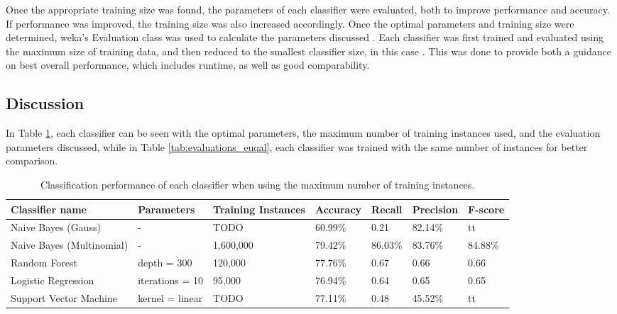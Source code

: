 Once the appropriate training size was found, the parameters of each classifier were evaluated, both to improve performance and accuracy. If performance was improved, the training size was also increased accordingly. Once the optimal parameters and training size were determined, weka's Evaluation class was used to calculate the parameters discussed \cite{weka}. Each classifier was first trained and evaluated using the maximum size of training data, and then reduced to the smallest classifier size, in this case . This was done to provide both a guidance on best overall performance, which includes runtime, as well as good comparability.

\subsection{Discussion}
In Table \ref{tab:evaluations_max}, each classifier can be seen with the optimal parameters, the maximum number of training instances used, and the evaluation parameters discussed, while in Table \ref{tab:evaluations_euqal}, each classifier was trained with the same number of instances for better comparison.
\begin{table}[]
\centering
\caption{Classification performance of each classifier when using the maximum number of training instances.}
\begin{tabular}{ |p{3cm}||p{3cm}|p{2cm}|p{1.5cm}|p{1.5cm}|p{1.5cm}|p{1.5cm}| }
 \hline
 Classifier name &          Parameters &             Training Instances &    Accuracy &      Recall &     Precision& F-score \\
 \hline
 Naive Bayes (Gauss)        &-&            TODO&                 60.99\%&        0.21&       82.14\%& tt\\
  \hline
 Naive Bayes (Multinomial)  &-&                     1,600,000&                79.42\%&        86.03\%&       83.76\%& 84.88\%\\
  \hline
 Random Forest              &depth = 300&            120,000&                 77.76\%&        0.67&       0.66& 0.66\\
  \hline
 Logistic Regression        &iterations = 10&            95,000&                 76.94\%&        0.64&       0.65& 0.65\\
  \hline
 Support Vector Machine     &kernel = linear&            TODO&                 77.11\%&        0.48&       45.52\%& tt\\
 \hline
\end{tabular}
\label{tab:evaluations_max}
\end{table}


